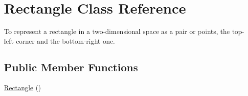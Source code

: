 \hypertarget{classRectangle}{}\section{Rectangle Class Reference}
\label{classRectangle}


To represent a rectangle in a two-\/dimensional space as a pair or points, the top-\/left corner and the bottom-\/right one.  


\subsection*{Public Member Functions}
\begin{DoxyCompactItemize}
\item 
\hyperlink{classRectangle_a8a933e0ebd9e80ce91e61ffe87fd577e}{Rectangle} ()\hypertarget{classRectangle_a8a933e0ebd9e80ce91e61ffe87fd577e}{}\label{classRectangle_a8a933e0ebd9e80ce91e61ffe87fd577e}


\end{DoxyCompactItemize}
